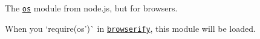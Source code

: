 The \href{https://nodejs.org/api/os.html}{\tt os} module from node.\+js, but for browsers.

When you `require(\textquotesingle{}os')\`{} in \href{http://github.com/substack/node-browserify}{\tt browserify}, this module will be loaded. 